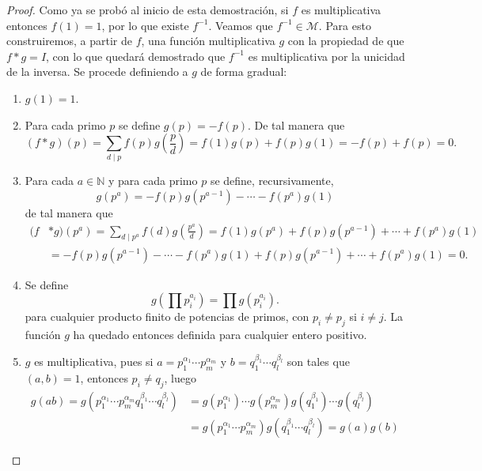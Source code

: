 \begin{proof}
Como ya se probó al inicio de esta demostración, si $f$ es multiplicativa entonces $f(1)=1$, por lo que existe $f^{-1}$. Veamos que $f^{-1} \in \mathcal{M}$. Para esto construiremos, a partir de $f$, una función multiplicativa $g$ con la propiedad de que $f*g=I$, con lo que quedará demostrado que $f^{-1}$ es multiplicativa por la unicidad de la inversa. Se procede definiendo a $g$ de forma gradual:
\begin{enumerate}[label=\textnormal{(\arabic*)},ref=\textnormal{\arabic*}]
\item $g(1)=1$.
\item Para cada primo $p$ se define $g(p)=-f(p)$. De tal manera que
	\begin{equation*}
		(f*g)(p) = \sum_{d \mid p} f(p)g \left( \frac{p}{d} \right) = f(1)g(p) + f(p)g(1) = -f(p) + f(p) = 0.
	\end{equation*}
\item \label{it:mul1} Para cada $a \in \mathbb{N}$ y para cada primo $p$ se define, recursivamente,
	\begin{equation*}
	    g(p^a)=-f(p)g(p^{a-1})-\cdots-f(p^a)g(1)
	\end{equation*}
	de tal manera que 
	\begin{align*}
		(f&*g)(p^a) = \sum_{d \mid p^a} f(d)g \left( \frac{p^a}{d} \right) = f(1)g(p^a)+f(p)g(p^{a-1})+\cdots+f(p^a)g(1) \\
				   &= -f(p)g(p^{a-1})-\cdots-f(p^a)g(1)+f(p)g(p^{a-1})+\cdots+f(p^a)g(1) = 0.
	\end{align*}
\item Se define
	\begin{equation*}
	    g \left( \prod p_i^{a_i} \right) = \prod g(p_i^{a_i}).
	\end{equation*}
	para cualquier producto finito de potencias de primos, con $p_i \ne p_j$ si $i \ne j$. La función $g$ ha quedado entonces definida para cualquier entero positivo.
\item $g$ es multiplicativa, pues si $a=p_1^{\alpha_1}\cdots p_m^{\alpha_m}$ y $b=q_1^{\beta_1}\cdots q_l^{\beta_l}$ son tales que $(a,b)=1$, entonces $p_i \ne q_j$, luego
	\begin{align*}
		g(a b) = g(p_1^{\alpha_1}\cdots p_m^{\alpha_m} q_1^{\beta_1}\cdots q_l^{\beta_l}) &= g(p_1^{\alpha_1})\cdots g(p_m^{\alpha_m})g(q_1^{\beta_1})\cdots g(q_l^{\beta_l}) \\
																				 &= g(p_1^{\alpha_1}\cdots p_m^{\alpha_m})g(q_1^{\beta_1}\cdots q_l^{\beta_l}) = g(a)g(b)
	\end{align*}

\end{enumerate}
\end{proof}
